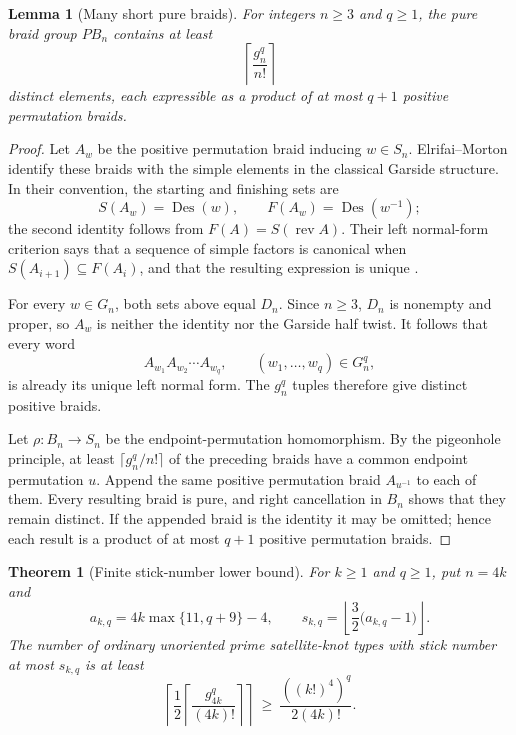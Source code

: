 \documentclass[11pt]{article}
\newtheorem{theorem}{Theorem}
\newtheorem{lemma}{Lemma}
\theoremstyle{remark}
\theoremstyle{plain}
\begin{document}
\begin{lemma}[Many short pure braids]\label{lem:short-pure-braids}
For integers \(n\ge3\) and \(q\ge1\), the pure braid group \(PB_n\) contains
at least
\[
    \left\lceil\frac{g_n^q}{n!}\right\rceil
\]
distinct elements, each expressible as a product of at most \(q+1\) positive
permutation braids.
\end{lemma}

\begin{proof}
Let \(A_w\) be the positive permutation braid inducing \(w\in S_n\).
Elrifai--Morton identify these braids with the simple elements in the classical
Garside structure.  In their convention, the starting and finishing sets are
\[
    S(A_w)=\operatorname{Des}(w),
    \qquad
    F(A_w)=\operatorname{Des}(w^{-1});
\]
the second identity follows from \(F(A)=S(\operatorname{rev}A)\).  Their left
normal-form criterion says that a sequence of simple factors is canonical
when \(S(A_{i+1})\subseteq F(A_i)\), and that the resulting expression is
unique
\cite[Lemmas 2.3 and 2.4 and Theorem 2.9]{ElrifaiMorton}.

For every \(w\in G_n\), both sets above equal \(D_n\).  Since \(n\ge3\),
\(D_n\) is nonempty and proper, so \(A_w\) is neither the identity nor the
Garside half twist.  It follows that every word
\[
    A_{w_1}A_{w_2}\cdots A_{w_q},
    \qquad (w_1,\ldots,w_q)\in G_n^q,
\]
is already its unique left normal form.  The \(g_n^q\) tuples therefore give
distinct positive braids.

Let \(\rho:B_n\to S_n\) be the endpoint-permutation homomorphism.  By the
pigeonhole principle, at least \(\lceil g_n^q/n!\rceil\) of the preceding
braids have a common endpoint permutation \(u\).  Append the same positive
permutation braid \(A_{u^{-1}}\) to each of them.  Every resulting braid is
pure, and right cancellation in \(B_n\) shows that they remain distinct.  If
the appended braid is the identity it may be omitted; hence each result is a
product of at most \(q+1\) positive permutation braids.
\end{proof}

\begin{theorem}[Finite stick-number lower bound]\label{thm:finite-stick-lower}
For \(k\ge1\) and \(q\ge1\), put \(n=4k\) and
\[
    a_{k,q}=4k\max\{11,q+9\}-4,
    \qquad
    s_{k,q}=\left\lfloor\frac32\bigl(a_{k,q}-1\bigr)\right\rfloor.
\]
The number of ordinary unoriented prime satellite-knot types with stick number
at most \(s_{k,q}\) is at least
\[
    \left\lceil
       \frac12\left\lceil\frac{g_{4k}^q}{(4k)!}\right\rceil
    \right\rceil
    \ \ge\
    \frac{((k!)^4)^q}{2(4k)!}.
\]
\end{theorem}
\end{document}
